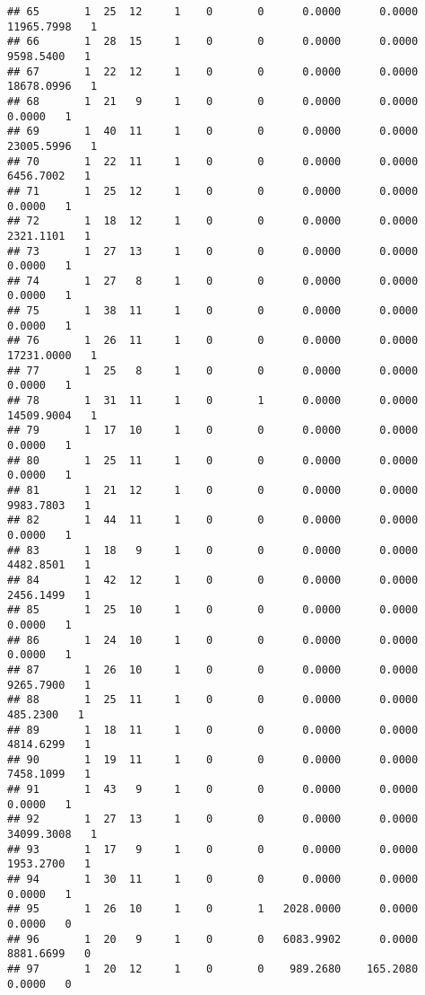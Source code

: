 \documentclass[
]{article}
\begin{document}
\begin{enumerate}
\begin{verbatim}
## 65       1  25  12     1    0       0      0.0000      0.0000  11965.7998   1
## 66       1  28  15     1    0       0      0.0000      0.0000   9598.5400   1
## 67       1  22  12     1    0       0      0.0000      0.0000  18678.0996   1
## 68       1  21   9     1    0       0      0.0000      0.0000      0.0000   1
## 69       1  40  11     1    0       0      0.0000      0.0000  23005.5996   1
## 70       1  22  11     1    0       0      0.0000      0.0000   6456.7002   1
## 71       1  25  12     1    0       0      0.0000      0.0000      0.0000   1
## 72       1  18  12     1    0       0      0.0000      0.0000   2321.1101   1
## 73       1  27  13     1    0       0      0.0000      0.0000      0.0000   1
## 74       1  27   8     1    0       0      0.0000      0.0000      0.0000   1
## 75       1  38  11     1    0       0      0.0000      0.0000      0.0000   1
## 76       1  26  11     1    0       0      0.0000      0.0000  17231.0000   1
## 77       1  25   8     1    0       0      0.0000      0.0000      0.0000   1
## 78       1  31  11     1    0       1      0.0000      0.0000  14509.9004   1
## 79       1  17  10     1    0       0      0.0000      0.0000      0.0000   1
## 80       1  25  11     1    0       0      0.0000      0.0000      0.0000   1
## 81       1  21  12     1    0       0      0.0000      0.0000   9983.7803   1
## 82       1  44  11     1    0       0      0.0000      0.0000      0.0000   1
## 83       1  18   9     1    0       0      0.0000      0.0000   4482.8501   1
## 84       1  42  12     1    0       0      0.0000      0.0000   2456.1499   1
## 85       1  25  10     1    0       0      0.0000      0.0000      0.0000   1
## 86       1  24  10     1    0       0      0.0000      0.0000      0.0000   1
## 87       1  26  10     1    0       0      0.0000      0.0000   9265.7900   1
## 88       1  25  11     1    0       0      0.0000      0.0000    485.2300   1
## 89       1  18  11     1    0       0      0.0000      0.0000   4814.6299   1
## 90       1  19  11     1    0       0      0.0000      0.0000   7458.1099   1
## 91       1  43   9     1    0       0      0.0000      0.0000      0.0000   1
## 92       1  27  13     1    0       0      0.0000      0.0000  34099.3008   1
## 93       1  17   9     1    0       0      0.0000      0.0000   1953.2700   1
## 94       1  30  11     1    0       0      0.0000      0.0000      0.0000   1
## 95       1  26  10     1    0       1   2028.0000      0.0000      0.0000   0
## 96       1  20   9     1    0       0   6083.9902      0.0000   8881.6699   0
## 97       1  20  12     1    0       0    989.2680    165.2080      0.0000   0

\end{verbatim}
\end{enumerate}
\end{document}
